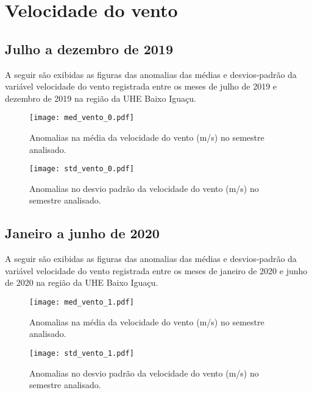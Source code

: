 \documentclass[a4paper,12pt]{article}
\begin{document}
        \newpage

        \section{Velocidade do vento }
        \subsection{Julho a dezembro de 2019}
        \hspace{0.5cm} A seguir são exibidas as figuras das anomalias das médias e desvios-padrão da variável velocidade do vento
        registrada entre os meses de julho de 2019 e dezembro de 2019 na região da UHE Baixo Iguaçu.

        \begin{figure}[!htb]
        \centering
        \texttt{[image: med\_vento\_0.pdf]}
        \caption{Anomalias na média da velocidade do vento (m/s) no semestre analisado.}
        \label{fig:figmed_vento_0}
        \end{figure}

        \begin{figure}[!htb]
        \centering
        \texttt{[image: std\_vento\_0.pdf]}
        \caption{Anomalias no desvio padrão da velocidade do vento (m/s) no semestre analisado.}
        \label{fig:figstd_vento_0}
        \end{figure}

        \newpage
        \subsection{Janeiro a junho de 2020}
        \hspace{0.5cm} A seguir são exibidas as figuras das anomalias das médias e desvios-padrão da variável velocidade do vento
        registrada entre os meses de janeiro de 2020 e junho de 2020 na região da UHE Baixo Iguaçu.

        \begin{figure}[!htb]
        \centering
        \texttt{[image: med\_vento\_1.pdf]}
        \caption{Anomalias na média da velocidade do vento (m/s) no semestre analisado.}
        \label{fig:figmed_vento_1}
        \end{figure}

        \begin{figure}[!htb]
        \centering
        \texttt{[image: std\_vento\_1.pdf]}
        \caption{Anomalias no desvio padrão da velocidade do vento (m/s) no semestre analisado.}
        \label{fig:figstd_vento_1}
        \end{figure}
\end{document}
